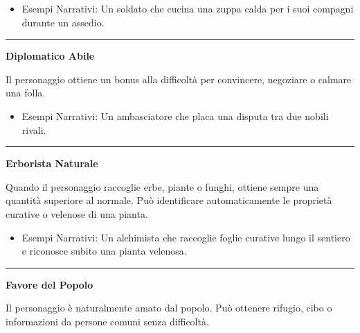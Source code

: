 \documentclass[../manuale_main.tex]{subfiles}
\begin{document}
\begin{itemize}
\item Esempi Narrativi: Un soldato che cucina una zuppa calda per i suoi compagni durante un assedio.
\end{itemize}

\vspace{0.5cm}
\noindent
\begin{center}
\rule{\textwidth}{0.4pt} 
\end{center}
\vspace{0.5cm}

\begin{center}
\textbf{\large{Diplomatico Abile}}\\
\end{center}
Il personaggio ottiene un bonus alla difficoltà per convincere, negoziare o calmare una folla.

\begin{itemize}
\item Esempi Narrativi: Un ambasciatore che placa una disputa tra due nobili rivali.
\end{itemize}

\vspace{0.5cm}
\noindent
\begin{center}
\rule{\textwidth}{0.4pt} 
\end{center}
\vspace{0.5cm}

\begin{center}
\textbf{\large{Erborista Naturale}}\\
\end{center}
Quando il personaggio raccoglie erbe, piante o funghi, ottiene sempre una quantità superiore al normale. Può identificare automaticamente le proprietà curative o velenose di una pianta.

\begin{itemize}
\item Esempi Narrativi: Un alchimista che raccoglie foglie curative lungo il sentiero e riconosce subito una pianta velenosa.
\end{itemize}

\vspace{0.5cm}
\noindent
\begin{center}
\rule{\textwidth}{0.4pt} 
\end{center}
\vspace{0.5cm}

\begin{center}
\textbf{\large{Favore del Popolo}}\\
\end{center}
Il personaggio è naturalmente amato dal popolo. Può ottenere rifugio, cibo o informazioni da persone comuni senza difficoltà.
\end{document}
